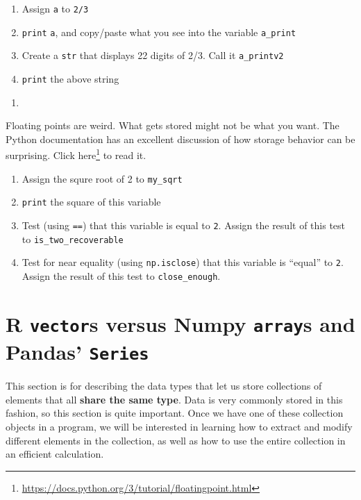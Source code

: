 \documentclass[
  12pt,
  krantz2]{krantz}
\providecommand{\tightlist}{%
  \setlength{\itemsep}{0pt}\setlength{\parskip}{0pt}}
\renewcommand{\href}[2]{#2\footnote{\url{#1}}}
\begin{document}
\begin{enumerate}
\def\labelenumi{\alph{enumi})}
\tightlist
\item
  Assign \texttt{a} to \texttt{2/3}
\item
  \texttt{print} \texttt{a}, and copy/paste what you see into the variable \texttt{a\_print}
\item
  Create a \texttt{str} that displays 22 digits of 2/3. Call it \texttt{a\_printv2}
\item
  \texttt{print} the above string
\end{enumerate}

\begin{enumerate}
\def\labelenumi{\arabic{enumi}.}
\setcounter{enumi}{2}
\tightlist
\item
\end{enumerate}

Floating points are weird. What gets stored might not be what you want. The Python documentation has an excellent discussion of how storage behavior can be surprising. Click \href{https://docs.python.org/3/tutorial/floatingpoint.html}{here} to read it.

\begin{enumerate}
\def\labelenumi{\alph{enumi})}
\tightlist
\item
  Assign the squre root of 2 to \texttt{my\_sqrt}
\item
  \texttt{print} the square of this variable
\item
  Test (using \texttt{==}) that this variable is equal to \texttt{2}. Assign the result of this test to \texttt{is\_two\_recoverable}
\item
  Test for near equality (using \texttt{np.isclose}) that this variable is ``equal'' to \texttt{2}. Assign the result of this test to \texttt{close\_enough}.
\end{enumerate}

\hypertarget{r-vectors-versus-numpy-arrays-and-pandas-series}{%
\chapter{\texorpdfstring{R \texttt{vector}s versus Numpy \texttt{array}s and Pandas' \texttt{Series}}{R vectors versus Numpy arrays and Pandas' Series}}\label{r-vectors-versus-numpy-arrays-and-pandas-series}}

This section is for describing the data types that let us store collections of elements that all \textbf{share the same type}. Data is very commonly stored in this fashion, so this section is quite important. Once we have one of these collection objects in a program, we will be interested in learning how to extract and modify different elements in the collection, as well as how to use the entire collection in an efficient calculation.
\end{document}
